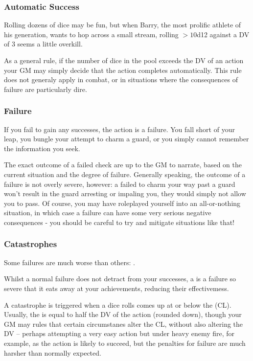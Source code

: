 \subsubsection{Automatic Success}

Rolling dozens of dice may be fun, but when Barry, the most prolific athlete of his generation, wants to hop across a small stream, rolling $>10$d12 against a DV of 3 seems a little overkill. 

As a general rule, if the number of dice in the pool exceeds the DV of an action your GM may simply decide that the action completes automatically. This rule does not generaly apply in combat, or in situations where the consequences of failure are particularly dire. 

\subsubsection{Failure}

If you fail to gain any successes, the action is a failure. You fall short of your leap, you bungle your attempt to charm a guard, or you simply cannot remember the information you seek. 

The exact outcome of a failed check are up to the GM to narrate, based on the current situation and the degree of failure. Generally speaking, the outcome of a failure is not overly severe, however: a failed  to charm your way past a guard won't result in the guard arresting or impaling you, they would simply not allow you to pass. Of course, you may have roleplayed yourself into an all-or-nothing situation, in which case a failure can have some very serious negative consequences - you should be careful to try and mitigate situations like that!

\subsubsection{Catastrophes}

Some failures are much worse than others: . 

Whilst a normal failure does not detract from your successes, a  is a failure so severe that it eats away at your achievements, reducing their effectivemess. 


A catastrophe is triggered when a dice rolls comes up at or below the  (CL). Usually, the  is equal to half the DV of the action (rounded down), though your GM may rules that certain circumstanes alter the CL, without also altering the DV -- perhaps attempting a very easy action but under heavy enemy fire, for example, as the action is likely to succeed, but the penalties for failure are much harsher than normally expected.

